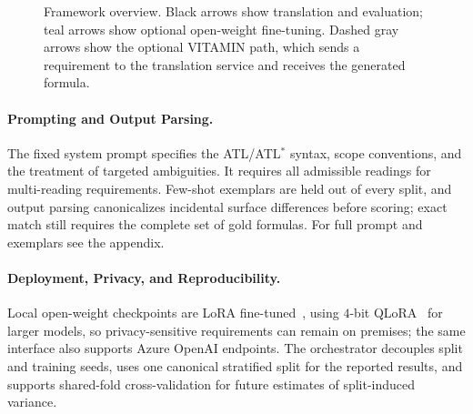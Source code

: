 \begin{figure}[t]
{%
}
\caption{Framework overview. Black arrows show translation and evaluation; teal arrows show optional open-weight fine-tuning. Dashed gray arrows show the optional \textsc{VITAMIN} path, which sends a requirement to the translation service and receives the generated formula.}
\label{fig:tool_pipeline}
\end{figure}

\paragraph{Prompting and Output Parsing.}
\label{subsec:prompting}
The fixed system prompt specifies the ATL/ATL$^\ast$ syntax, scope conventions, and the treatment of targeted ambiguities. It requires all admissible readings for multi-reading requirements. Few-shot exemplars are held out of every split, and output parsing canonicalizes incidental surface differences before scoring; exact match still requires the complete set of gold formulas. For full prompt and exemplars see the appendix.

\paragraph{Deployment, Privacy, and Reproducibility.}
\label{subsec:scale}
Local open-weight checkpoints are LoRA fine-tuned~\cite{hu2022lora}, using $4$-bit QLoRA~\cite{dettmers2023qlora} for larger models, so privacy-sensitive requirements can remain on premises; the same interface also supports Azure OpenAI endpoints. The orchestrator decouples split and training seeds, uses one canonical stratified split for the reported results, and supports shared-fold cross-validation for future estimates of split-induced variance.

